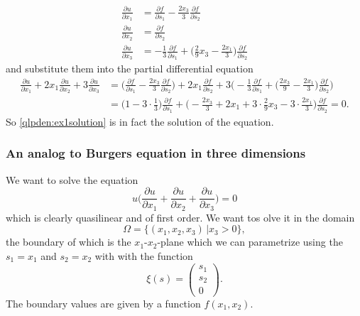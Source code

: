 \begin{align*}
\frac{\partial u}{\partial x_1}
&=
\frac{\partial f}{\partial s_1}
-\frac{2x_3}{3}
\frac{\partial f}{\partial s_2}
\\
\frac{\partial u}{\partial x_2}
&=
\frac{\partial f}{\partial s_2}
\\
\frac{\partial u}{\partial x_3}
&=
-
\frac{1}{3}
\frac{\partial f}{\partial s_1}
+
\biggl(
\frac{2}{9}x_3-\frac{2x_1}{3}
\biggr)
\frac{\partial f}{\partial s_2}
\end{align*}
and substitute them into the partial differential equation
\begin{align*}
\frac{\partial u}{\partial x_1}
+
2x_1\frac{\partial u}{\partial x_2}
+
3
\frac{\partial u}{\partial x_3}
&=
\biggl(
\frac{\partial f}{\partial s_1}
-\frac{2x_3}3
\frac{\partial f}{\partial s_2}
\biggr)
+2x_1
\frac{\partial f}{\partial s_2}
+
3
\biggl(
-
\frac{1}{3}
\frac{\partial f}{\partial s_1}
+
\biggl(
\frac{2x_3}{9}
-\frac{2x_1}{3}
\biggr)
\frac{\partial f}{\partial s_2}
\biggr)
\\
&=
\biggl(
1-3\cdot\frac13
\biggr)
\frac{\partial f}{\partial s_1}
+
\biggl(
-\frac{2x_3}{3}
+
2x_1
+
3\cdot \frac{2}{9}x_3
-3\cdot\frac{2x_1}{3}
\biggr)
\frac{\partial f}{\partial s_2}
=0.
\end{align*}
So \eqref{qlpden:ex1solution} is in fact the solution of the equation.

\subsubsection{An analog to Burgers equation in three dimensions}
We want to solve the equation
\begin{equation}
u\biggl(
\frac{\partial u}{\partial x_1}
+
\frac{\partial u}{\partial x_2}
+
\frac{\partial u}{\partial x_3}
\biggr)
=
0
\end{equation}
which is clearly quasilinear and of first order.
We want tos olve it in the domain
\[
\Omega
=
\{ (x_1,x_2,x_3) \,| x_3>0\},
\]
the boundary of which is the $x_1$-$x_2$-plane which we can parametrize
using the $s_1=x_1$ and $s_2=x_2$ with with the function
\[
\xi(s)
=
\begin{pmatrix}
s_1\\
s_2\\
0
\end{pmatrix}.
\]
The boundary values are given by a function $f(x_1,x_2)$.

